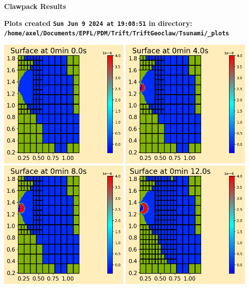 \documentclass[11pt]{article}
\begin{document}
        \begin{center}{\Large\bf Clawpack Results}\vskip 5pt
        
        \bf Plots created {\tt Sun Jun  9 2024 at 19:08:51} in directory: \vskip 5pt
        \verb+/home/axel/Documents/EPFL/PDM/Trift/TriftGeoclaw/Tsunami/_plots+
        \end{center}
        \vskip 5pt
        \includegraphics[width=0.475\textwidth]{frame0000fig0.png}
\vskip 10pt 
\includegraphics[width=0.475\textwidth]{frame0001fig0.png}
\vskip 10pt 
\includegraphics[width=0.475\textwidth]{frame0002fig0.png}
\vskip 10pt 
\includegraphics[width=0.475\textwidth]{frame0003fig0.png}
\end{document}
